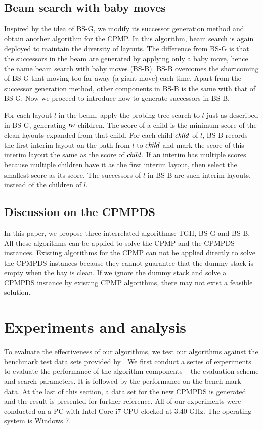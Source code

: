 \documentclass[review,3p,times,authoryear,12pt]{elsarticle}
\begin{document}
\subsection{Beam search with baby moves}

Inspired by the idea of BS-G, we modify its successor generation method and obtain another algorithm for the CPMP. In this algorithm, beam search is again deployed to maintain the diversity of layouts. The difference from BS-G is that the successors in the beam are generated by applying only a baby move, hence the name beam search with baby moves (BS-B). BS-B overcomes the shortcoming of BS-G that moving too far away (a giant move) each time. Apart from the successor generation method, other components in BS-B is the same with that of BS-G. Now we proceed to introduce how to generate successors in BS-B.

For each layout $l$ in the beam, apply the probing tree search to $l$ just as described in BS-G, generating $\id{tw}$ children. The score of a child is the minimum score of the clean layouts expanded from that child. For each child $\id{child}$ of $l$, BS-B records the first interim layout on the path from $l$ to $\id{child}$ and mark the score of this interim layout the same as the score of $\id{child}$. If an interim has multiple scores because multiple children have it as the first interim layout, then select the smallest score as its score. The successors of $l$ in BS-B are such interim layouts, instead of the children of $l$.

\subsection{Discussion on the CPMPDS}
In this paper, we propose three interrelated algorithms: TGH, BS-G and BS-B. All these algorithms can be applied to solve the CPMP and the CPMPDS instances. Existing algorithms for the CPMP can not be applied directly to solve the CPMPDS instances because they cannot guarantee that the dummy stack is empty when the bay is clean. If we ignore the dummy stack and solve a CPMPDS instance by existing CPMP algorithms, there may not exist a feasible solution.
\section{Experiments and analysis}
\label{sec:ce}
To evaluate the effectiveness of our algorithms, we test our algorithms against the benchmark test data sets provided by \cite{BF2012}.
We first conduct a series of experiments to evaluate the performance of the algorithm components -- the evaluation scheme and search parameters.
It is followed by the performance on the bench mark data.
At the last of this section, a data set for the new CPMPDS is generated and the result is presented for further reference. All of our experiments were conducted on a PC with Intel Core i7 CPU clocked at 3.40 GHz. The operating system is Windows 7.
\end{document}
